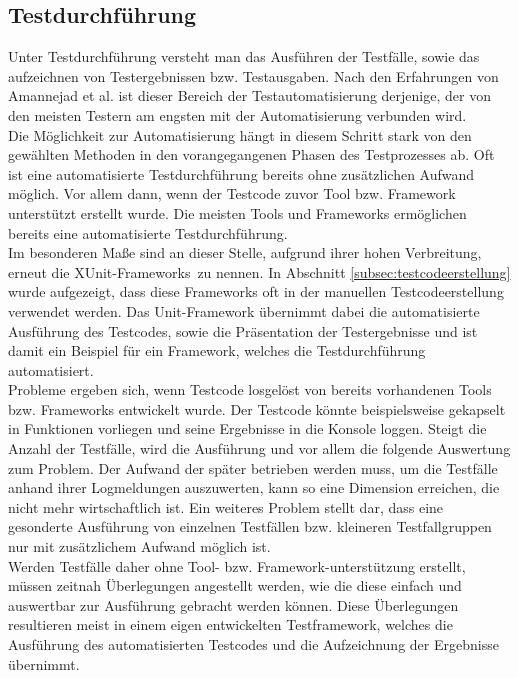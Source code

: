 \subsection{Testdurchführung}
\label{subsec:testdurchführung}
Unter Testdurchführung versteht man das Ausführen der Testfälle, sowie das aufzeichnen von Testergebnissen bzw. Testausgaben. Nach den Erfahrungen von Amannejad et al. \cite{amannejad_search-based_2014} ist dieser Bereich der Testautomatisierung derjenige, der von den meisten Testern am engsten mit der Automatisierung verbunden wird.\\
Die Möglichkeit zur Automatisierung hängt in diesem Schritt stark von den gewählten Methoden in den vorangegangenen Phasen des Testprozesses ab. Oft ist eine automatisierte Testdurchführung bereits ohne zusätzlichen Aufwand möglich. Vor allem dann, wenn der Testcode zuvor Tool bzw. Framework unterstützt erstellt wurde.
Die meisten Tools und Frameworks ermöglichen bereits eine automatisierte Testdurchführung.\\
Im besonderen Maße sind an dieser Stelle, aufgrund ihrer hohen Verbreitung, erneut die \grq XUnit-Frameworks\grq\ zu nennen.
In Abschnitt \ref{subsec:testcodeerstellung} wurde aufgezeigt, dass diese Frameworks oft in der manuellen Testcodeerstellung verwendet werden. Das Unit-Framework übernimmt dabei die automatisierte Ausführung des Testcodes, sowie die Präsentation der Testergebnisse und ist damit ein Beispiel für ein Framework, welches die Testdurchführung automatisiert.\\
Probleme ergeben sich, wenn Testcode losgelöst von bereits vorhandenen Tools bzw. Frameworks entwickelt wurde. Der Testcode könnte beispielsweise gekapselt in Funktionen vorliegen und seine Ergebnisse in die Konsole loggen. Steigt die Anzahl der Testfälle, wird die Ausführung und vor allem die folgende Auswertung zum Problem. Der Aufwand der später betrieben werden muss, um die Testfälle anhand ihrer Logmeldungen auszuwerten, kann so eine Dimension erreichen, die nicht mehr wirtschaftlich ist. Ein weiteres Problem stellt dar, dass eine gesonderte Ausführung von einzelnen Testfällen bzw. kleineren Testfallgruppen nur mit zusätzlichem Aufwand möglich ist.\\
Werden Testfälle daher ohne Tool- bzw. Framework-unterstützung erstellt, müssen zeitnah Überlegungen angestellt werden, wie die diese einfach und auswertbar zur Ausführung gebracht werden können.
Diese Überlegungen resultieren meist in einem eigen entwickelten Testframework, welches die Ausführung des automatisierten Testcodes und die Aufzeichnung der Ergebnisse übernimmt.


